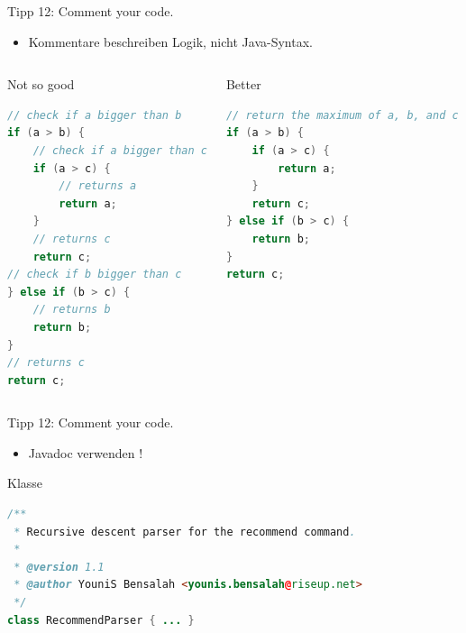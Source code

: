 \documentclass[18pt]{beamer}
\begin{document}
\begin{frame}[fragile]{Tipp 12: Comment your code.}
    \begin{itemize}
        \item Kommentare beschreiben Logik, nicht Java-Syntax.
    \end{itemize}
    \begin{columns}[c]
        \begin{alertblock}{Not so good}
            \begin{lstlisting}[language=Java,basicstyle=\scriptsize]
// check if a bigger than b
if (a > b) {
    // check if a bigger than c
    if (a > c) {
        // returns a
        return a;
    }
    // returns c
    return c;
// check if b bigger than c
} else if (b > c) {
    // returns b
    return b;
}
// returns c
return c;
            \end{lstlisting}
        \end{alertblock}
        \begin{exampleblock}{Better}
            \begin{lstlisting}[language=Java,basicstyle=\scriptsize]
// return the maximum of a, b, and c
if (a > b) {
    if (a > c) {
        return a;
    }
    return c;
} else if (b > c) {
    return b;
}
return c;
            \end{lstlisting}
        \end{exampleblock}
    \end{columns}
\end{frame}

\begin{frame}[fragile]{Tipp 12: Comment your code.}
    \begin{itemize}
        \item Javadoc verwenden !
    \end{itemize}
    \begin{exampleblock}{Klasse}
        \begin{lstlisting}[language=Java,basicstyle=\tiny]
/**
 * Recursive descent parser for the recommend command.
 *
 * @version 1.1
 * @author YouniS Bensalah <younis.bensalah@riseup.net>
 */
class RecommendParser { ... }
        \end{lstlisting}
    \end{exampleblock}
\end{frame}
\end{document}
